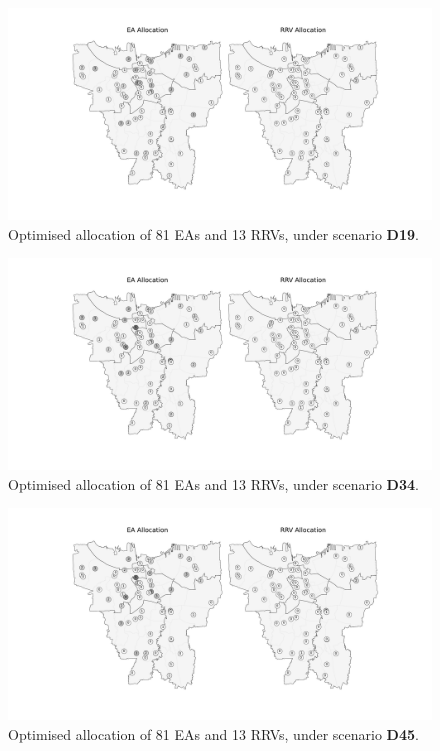 \documentclass[preprint,12pt]{elsarticle}
\begin{document}
\begin{figure}
\begin{center}
\includegraphics[width=\textwidth]{img/map_optimised_19}
\caption{Optimised allocation of 81 EAs and 13 RRVs, under scenario \textbf{D19}.}
\label{fig:optimal_current_allocation_19}
\end{center}
\end{figure}

\begin{figure}
\begin{center}
\includegraphics[width=\textwidth]{img/map_optimised_34}
\caption{Optimised allocation of 81 EAs and 13 RRVs, under scenario \textbf{D34}.}
\label{fig:optimal_current_allocation_34}
\end{center}
\end{figure}

\begin{figure}
\begin{center}
\includegraphics[width=\textwidth]{img/map_optimised_45}
\caption{Optimised allocation of 81 EAs and 13 RRVs, under scenario \textbf{D45}.}
\label{fig:optimal_current_allocation_45}
\end{center}
\end{figure}





\end{document}
